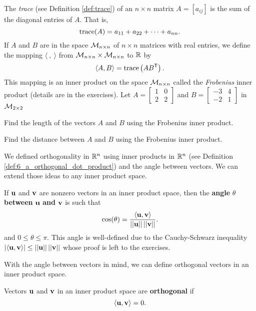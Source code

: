 \begin{activity} \label{act:6_c_Frobenius} The \emph{trace} (see Definition \ref{def:trace}) of an $n \times n$ matrix $A = [a_{ij}]$ is the sum of the diagonal entries of $A$. That is,
\[\text{trace}(A) = a_{11} + a_{22} + \cdots + a_{nn}.\]
If $A$ and $B$ are in the space $\mathcal{M}_{n \times n}$ of $n \times n$ matrices with real entries, we define the mapping $\langle  \ , \ \rangle$ from $\mathcal{M}_{n \times n} \times \mathcal{M}_{n \times n}$ to $\mathbb{R}$ by  
\[\langle A, B \rangle = \text{trace}\left(AB^{\mathsf{T}}\right).\]
This mapping is an inner product on the space $\mathcal{M}_{n \times n}$ called the \emph{Frobenius} inner product (details are in the exercises). Let $A = \left[ \begin{array}{cc} 1&0\\2&2 \end{array} \right]$ and $B = \left[ \begin{array}{rc} -3&4\\-2&1 \end{array} \right]$ in $\mathcal{M}_{2 \times 2}$
\ba
\item Find the length of the vectors $A$ and $B$ using the Frobenius inner product. 
 
 \item Find the distance between $A$ and $B$ using the Frobenius inner product. 
 
 \ea

\end{activity}





We defined orthogonality in $\mathbb{R}^n$ using inner products in $\mathbb{R}^n$ (see Definition \ref{def:6_a_orthogonal_dot_product}) and the angle between vectors. We can extend those ideas to any inner product space. 

If $\mathbf{u}$ and $\mathbf{v}$ are nonzero vectors in an inner product space, then the \textbf{angle} $\theta$ \textbf{between} $\mathbf{u}$ \textbf{and} $\mathbf{v}$ is such that 
\[\cos(\theta) = \frac{\langle \mathbf{u}, \mathbf{v} \rangle}{||\mathbf{u}||\, ||\mathbf{v}||}.\]
and $0\leq \theta \leq \pi$. This angle is well-defined due to the Cauchy-Schwarz inequality $|\langle \mathbf{u}, \mathbf{v} \rangle| \leq ||\mathbf{u}||\, ||\mathbf{v}||$ whose proof is left to the exercises.

With the angle between vectors in mind, we can define orthogonal vectors in an inner product space. 

\begin{definition} Vectors $\mathbf{u}$ and $\mathbf{v}$ in an inner product space are \textbf{orthogonal} if
\[\langle \mathbf{u}, \mathbf{v} \rangle = 0.\]
\end{definition}
 

